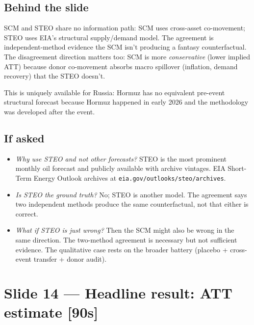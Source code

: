 \documentclass[11pt,a4paper]{article}
\newcommand{\timetag}[1]{\hfill\textcolor{muted}{\small[#1]}}
\begin{document}
\subsection{Behind the slide}
SCM and STEO share no information path: SCM uses cross-asset co-movement; STEO uses EIA's structural supply/demand model. The agreement is independent-method evidence the SCM isn't producing a fantasy counterfactual. The disagreement direction matters too: SCM is more \emph{conservative} (lower implied ATT) because donor co-movement absorbs macro spillover (inflation, demand recovery) that the STEO doesn't.

This is uniquely available for Russia: Hormuz has no equivalent pre-event structural forecast because Hormuz happened in early 2026 and the methodology was developed after the event.

\subsection{If asked}
\begin{itemize}
  \item \textit{Why use STEO and not other forecasts?} STEO is the most prominent monthly oil forecast and publicly available with archive vintages. EIA Short-Term Energy Outlook archives at \texttt{eia.gov/outlooks/steo/archives}.
  \item \textit{Is STEO the ground truth?} No; STEO is another model. The agreement says two independent methods produce the same counterfactual, not that either is correct.
  \item \textit{What if STEO is just wrong?} Then the SCM might also be wrong in the same direction. The two-method agreement is necessary but not sufficient evidence. The qualitative case rests on the broader battery (placebo + cross-event transfer + donor audit).
\end{itemize}

\section{Slide 14 --- Headline result: ATT estimate \timetag{90s}}
\end{document}
